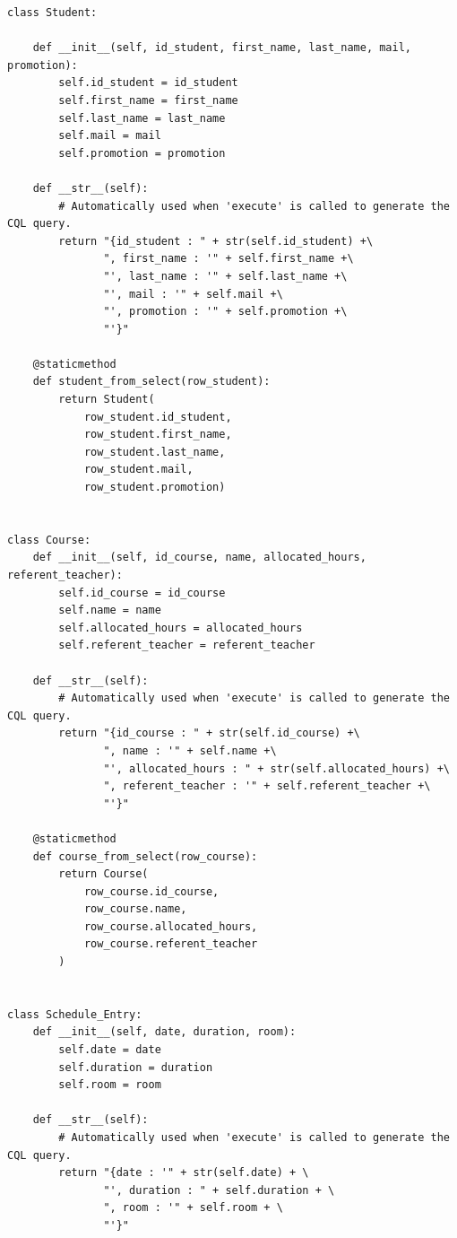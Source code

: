 \documentclass[a4paper, 11pt]{article}
\begin{document}
\scriptsize
\begin{tcolorbox}
\begin{verbatim}
class Student:

    def __init__(self, id_student, first_name, last_name, mail, promotion):
        self.id_student = id_student
        self.first_name = first_name
        self.last_name = last_name
        self.mail = mail
        self.promotion = promotion

    def __str__(self):
        # Automatically used when 'execute' is called to generate the CQL query.
        return "{id_student : " + str(self.id_student) +\
               ", first_name : '" + self.first_name +\
               "', last_name : '" + self.last_name +\
               "', mail : '" + self.mail +\
               "', promotion : '" + self.promotion +\
               "'}"

    @staticmethod
    def student_from_select(row_student):
        return Student(
            row_student.id_student,
            row_student.first_name,
            row_student.last_name,
            row_student.mail,
            row_student.promotion)


class Course:
    def __init__(self, id_course, name, allocated_hours, referent_teacher):
        self.id_course = id_course
        self.name = name
        self.allocated_hours = allocated_hours
        self.referent_teacher = referent_teacher

    def __str__(self):
        # Automatically used when 'execute' is called to generate the CQL query.
        return "{id_course : " + str(self.id_course) +\
               ", name : '" + self.name +\
               "', allocated_hours : " + str(self.allocated_hours) +\
               ", referent_teacher : '" + self.referent_teacher +\
               "'}"

    @staticmethod
    def course_from_select(row_course):
        return Course(
            row_course.id_course,
            row_course.name,
            row_course.allocated_hours,
            row_course.referent_teacher
        )


class Schedule_Entry:
    def __init__(self, date, duration, room):
        self.date = date
        self.duration = duration
        self.room = room

    def __str__(self):
        # Automatically used when 'execute' is called to generate the CQL query.
        return "{date : '" + str(self.date) + \
               "', duration : " + self.duration + \
               ", room : '" + self.room + \
               "'}"
\end{verbatim}
\end{tcolorbox}
\normalsize
\end{document}
